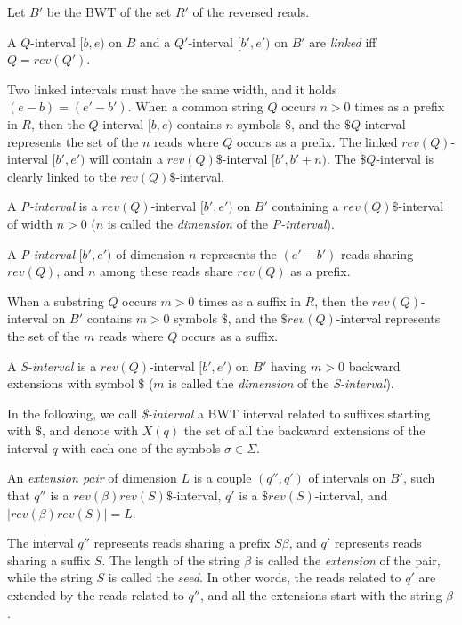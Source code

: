 \documentclass[runningheads,envcountsame,a4paper]{llncs}
\begin{document}
Let $B'$ be the BWT of the set $R'$ of the reversed reads.

\begin{definition}
A $Q$-interval $[b,e)$ on $B$ and a $Q'$-interval $[b',e')$ on $B'$ are \emph{linked} iff $Q=rev(Q')$.
\end{definition}

Two linked intervals must have the same width, and it holds $(e-b)=(e'-b')$.
When a common string $Q$ occurs $n>0$ times as a prefix in $R$, then the $Q$-interval $[b,e)$ contains $n$ symbols $\$$, and the $\$ Q$-interval represents the set of the $n$ reads where $Q$ occurs as a prefix. The linked $rev(Q)$-interval $[b',e')$ will contain a $rev(Q)\$$-interval $[b',b'+n)$. The $\$ Q$-interval is clearly linked to the $rev(Q)\$$-interval.

\begin{definition}
A \emph{P-interval} is a $rev(Q)$-interval $[b',e')$ on $B'$ containing a $rev(Q)\$$-interval of width $n>0$ ($n$ is called the \emph{dimension} of the \emph{P-interval}).
\end{definition}

A \emph{P-interval} $[b',e')$ of dimension $n$ represents the $(e'-b')$ reads sharing $rev(Q)$, and $n$ among these reads share $rev(Q)$ as a prefix.

When a substring $Q$ occurs $m>0$ times as a suffix in $R$, then the $rev(Q)$-interval on $B'$ contains $m>0$ symbols $\$$, and the $\$ rev(Q)$-interval represents the set of the $m$ reads where $Q$ occurs as a suffix.

\begin{definition}
A \emph{S-interval} is a $rev(Q)$-interval $[b',e')$ on $B'$ having $m>0$ backward extensions with symbol $\$$  ($m$ is called the \emph{dimension} of the \emph{S-interval}).
\end{definition}

In the following, we call \emph{\$-interval} a BWT interval related to suffixes starting with $\$$, and denote with $X(q)$ the set of all the backward extensions of the interval $q$ with each one of the symbols $\sigma \in \Sigma$.

\begin{definition}
An \emph{extension pair} of dimension $L$ is a couple $(q'', q')$ of intervals on $B'$, such that $q''$ is a $rev(\beta)rev(S)\$$-interval, $q'$ is a $\$rev(S)$-interval,
and $|rev(\beta)rev(S)| = L$.
\end{definition}

The interval $q''$ represents reads sharing a prefix $S\beta$, and $q'$ represents reads sharing a suffix $S$. The length of the string $\beta$ is called the \emph{extension} of the pair, while the string $S$ is called the \emph{seed}. In other words, the reads related to $q'$ are extended by the reads related to $q''$, and all the extensions start with the string $\beta$.
\end{document}
